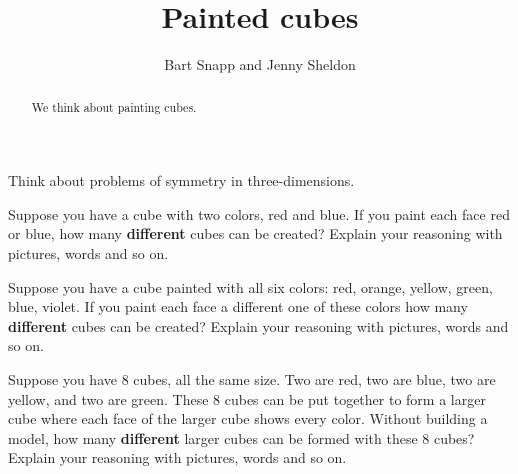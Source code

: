 \documentclass[noauthor,nooutcomes,hints,handout,12pt]{ximera}
\title{Painted cubes}
\author{Bart Snapp and Jenny Sheldon}
\begin{document}
\begin{abstract}
  We think about painting cubes.
\end{abstract}
\maketitle

\begin{listOutcomes}
\item Think about problems of symmetry in three-dimensions.
\end{listOutcomes}
\mynewpage


\begin{question}
  Suppose you have a cube with two colors, red and blue. If you paint
  each face red or blue, how many \textbf{different} cubes can be created?
  Explain your reasoning with pictures, words and so on.
\end{question}
\mynewpage



\begin{question}%
  Suppose you have a cube painted with all six colors: red, orange,
  yellow, green, blue, violet. If you paint each face a different one
  of these colors how many \textbf{different} cubes can be created?
  Explain your reasoning with pictures, words and so on.
\end{question}
\mynewpage



\begin{question}
  Suppose you have $8$ cubes, all the same size. Two are red, two are
  blue, two are yellow, and two are green. These 8 cubes can be put
  together to form a larger cube where each face of the larger cube
  shows every color. Without building a model, how many
  \textbf{different} larger cubes can be formed with these $8$ cubes?
  Explain your reasoning with pictures, words and so on.
\end{question}
\end{document}
